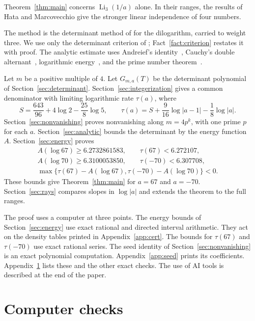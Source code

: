 \documentclass{amsart}
\numberwithin{equation}{section}
\numberwithin{table}{section}
\begin{document}
Theorem~\ref{thm:main} concerns $\operatorname{Li}_3(1/a)$ alone. In their
ranges, the results of Hata and Marcovecchio give the stronger linear
independence of four numbers.

The method is the determinant method of \cite{Zh} for the dilogarithm,
carried to weight three. We use only the determinant criterion of
\cite[Section~3]{Zh}; Fact~\ref{fact:criterion} restates it with proof.
The analytic estimate uses Andreief's identity~\cite{Andreief}, Cauchy's
double alternant~\cite{Krattenthaler}, logarithmic
energy~\cite{SaffTotik}, and the prime number theorem~\cite{Davenport}.

Let $m$ be a positive multiple of $4$. Let $G_{m,a}(T)$ be the determinant polynomial of
Section~\ref{sec:determinant}. Section~\ref{sec:integerization} gives a
common denominator with limiting logarithmic rate $\tau(a)$, where
\[
S=\frac{643}{96}+4\log2-\frac{25}{8}\log5,
\qquad
\tau(a)=S+\frac9{16}\log|a-1|-\frac18\log|a|.
\]
Section~\ref{sec:nonvanishing} proves nonvanishing along $m=4p^k$, with one
prime $p$ for each $a$. Section~\ref{sec:analytic} bounds the determinant
by the energy function $A$. Section~\ref{sec:energy} proves
\[
\begin{gathered}
A(\log67)\ge6.2732861583,\qquad \tau(67)<6.272107,\\
A(\log70)\ge6.3100053850,\qquad \tau(-70)<6.307708,\\
\max\{\tau(67)-A(\log67),\tau(-70)-A(\log70)\}<0.
\end{gathered}
\]
These bounds give Theorem~\ref{thm:main} for $a=67$ and $a=-70$.
Section~\ref{sec:rays} compares slopes in $\log|a|$ and extends the
theorem to the full ranges.

The proof uses a computer at three points. The energy bounds of
Section~\ref{sec:energy} use exact rational and directed interval
arithmetic. They act on the density tables printed in
Appendix~\ref{app:cert}. The bounds for
$\tau(67)$ and $\tau(-70)$ use exact rational series. The seed identity of
Section~\ref{sec:nonvanishing} is an exact polynomial computation.
Appendix~\ref{app:seed} prints its coefficients. Appendix~\ref{app:checks}
lists these and the other exact checks. The use of AI tools is described
at the end of the paper.




\section{Computer checks}\label{app:checks}
\end{document}
